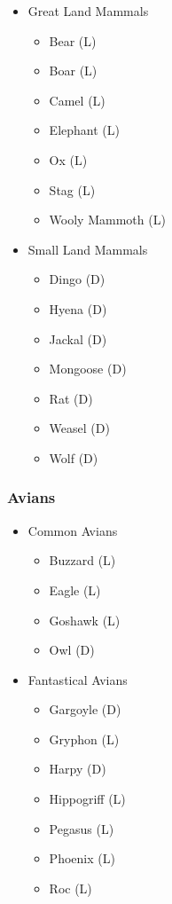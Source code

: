 \begin{multicols}{3}
\begin{itemize}
\item Great Land Mammals
\begin{itemize}
\item Bear (L)
\item Boar (L)
\item Camel (L)
\item Elephant (L)
\item Ox (L)
\item Stag (L)
\item Wooly Mammoth (L)
\end{itemize}

\item{Small Land Mammals}
\begin{itemize}
\item Dingo (D)
\item Hyena (D)
\item Jackal (D)
\item Mongoose (D)
\item Rat (D)
\item Weasel (D)
\item Wolf (D)
\end{itemize}
\end{itemize}

\subsubsection{Avians}

\begin{itemize}
\item Common Avians
\begin{itemize}
\item Buzzard (L)
\item Eagle (L)
\item Goshawk (L)
\item Owl (D)
\end{itemize}

\item Fantastical Avians
\begin{itemize}
\item Gargoyle (D)
\item Gryphon (L)
\item Harpy (D)
\item Hippogriff (L)
\item Pegasus (L)
\item Phoenix (L)
\item Roc (L)
\end{itemize}
\end{itemize}


\end{multicols}
